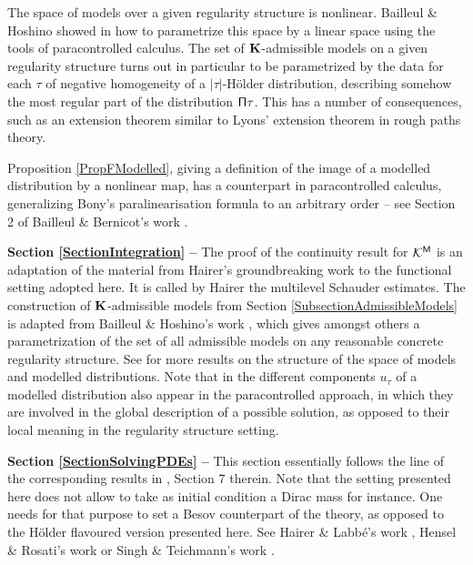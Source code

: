 \documentclass[10pt, reqno]{amsart}
\numberwithin{subsection}{section}
\numberwithin{subsubsection}{subsection}
\numberwithin{equation}{section} %
\theoremstyle{mystyle}
\theoremstyle{mystyle2}
\theoremstyle{mystyle3}
\newcommand{\ssk}{\smallskip}
\newcommand{\mcK}{\mathcal{K}}
\begin{document}
\ssk

The space of models over a given regularity structure is nonlinear. Bailleul \& Hoshino showed in \cite{BH1, BH2} how to parametrize this space by 
a linear space using the tools of paracontrolled calculus. The set of $\bf K$-admissible models on a given regularity structure turns out in particular to be parametrized by the data for each $\tau$ of negative homogeneity of a $\vert\tau\vert$-H\"older distribution, describing somehow the most regular part of the distribution ${\sf \Pi}\tau$. This has a number of consequences, such as an extension theorem similar to Lyons' extension theorem in rough paths theory.   

\ssk

Proposition \ref{PropFModelled}, giving a definition of the image of a modelled distribution by a nonlinear map, has a counterpart in paracontrolled calculus, generalizing Bony's paralinearisation formula to an arbitrary order -- see Section 2 of Bailleul \& Bernicot's work \cite{BB3}.   

\medskip

\textbf{\textsf{Section \ref{SectionIntegration} -- }} The proof of the continuity result for $\mcK^{\sf M}$ is an adaptation of the material from 
Hairer's groundbreaking work \cite{Hai14} to the functional setting adopted here. It is called by Hairer the multilevel Schauder estimates.  The construction of $\bf K$-admissible models from Section \ref{SubsectionAdmissibleModels} is adapted from Bailleul \& Hoshino's work \cite{BH1}, which gives amongst others a parametrization of the set of all admissible models on any reasonable concrete regularity structure. See \cite{BH2} for more results on the structure of the space of models and modelled distributions. Note that in the different components $u_\tau$ of a modelled distribution also appear in the paracontrolled approach, in which they are involved in the global description of a possible solution, as opposed to their local meaning in the regularity structure setting. 

\medskip

\textbf{\textsf{Section \ref{SectionSolvingPDEs} -- }} This section essentially follows the line of the corresponding results in \cite{Hai14}, Section 7 therein. Note that the setting presented here does not allow to take as initial condition a Dirac mass for instance. One needs for that purpose to set a Besov counterpart of the theory, as opposed to the H\"older flavoured version presented here. See Hairer \& Labb\'e's work \cite{HairerLabbe}, Hensel \& Rosati's work \cite{HenselRosati} or Singh \& Teichmann's work \cite{SinghTeichmann}. 
\end{document}

